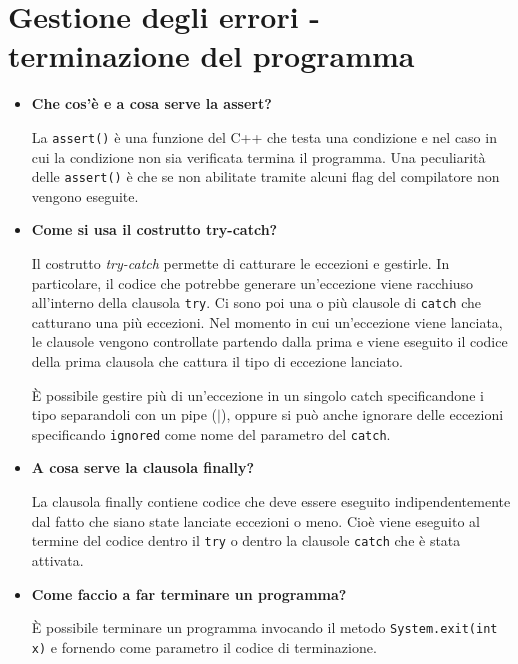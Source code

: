\documentclass[12pt, a4paper]{article}
\begin{document}
\section{Gestione degli errori - terminazione del programma}
\begin{itemize}
    \item \textbf{Che cos'è e a cosa serve la assert?}
    
    La \texttt{assert()} è una funzione del C++ che testa una condizione e nel
    caso in cui la condizione non sia verificata termina il programma. Una
    peculiarità delle \texttt{assert()} è che se non abilitate tramite alcuni
    flag del compilatore non vengono eseguite.

    \item \textbf{Come si usa il costrutto try-catch?}
    
    Il costrutto \emph{try-catch} permette di catturare le eccezioni e gestirle.
    In particolare, il codice che potrebbe generare un'eccezione viene racchiuso
    all'interno della clausola \texttt{try}. Ci sono poi una o più clausole di
    \texttt{catch} che catturano una più eccezioni. Nel momento in cui un'eccezione
    viene lanciata, le clausole vengono controllate partendo dalla prima e viene
    eseguito il codice della prima clausola che cattura il tipo di eccezione lanciato.

    È possibile gestire più di un'eccezione in un singolo catch specificandone i
    tipo separandoli con un pipe ($|$), oppure si può anche ignorare delle eccezioni
    specificando \texttt{ignored} come nome del parametro del \texttt{catch}.

    \item \textbf{A cosa serve la clausola finally?}
    
    La clausola finally contiene codice che deve essere eseguito indipendentemente
    dal fatto che siano state lanciate eccezioni o meno. Cioè viene eseguito al
    termine del codice dentro il \texttt{try} o dentro la clausole \texttt{catch}
    che è stata attivata.

    \item \textbf{Come faccio a far terminare un programma?}
    
    È possibile terminare un programma invocando il metodo \texttt{System.exit(int x)}
    e fornendo come parametro il codice di terminazione.
\end{itemize}
\end{document}
